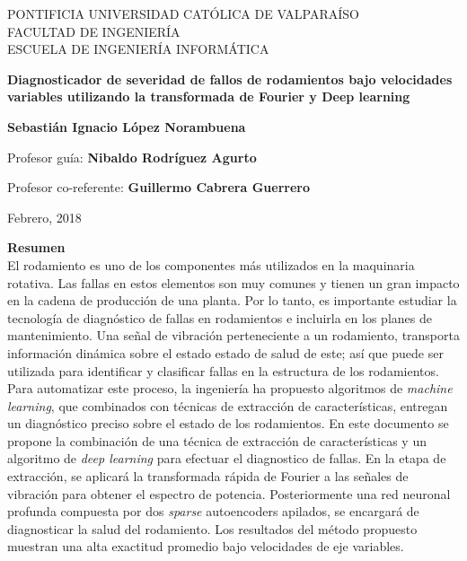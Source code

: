 \documentclass[12pt]{article}
\begin{document}
\thispagestyle{empty}

\begin{center}
PONTIFICIA UNIVERSIDAD CATÓLICA DE VALPARAÍSO\\
FACULTAD DE INGENIERÍA\\
ESCUELA DE INGENIERÍA INFORMÁTICA\\

\vspace{4cm}

\Large{\textbf{Diagnosticador de severidad de fallos de rodamientos bajo velocidades variables utilizando la transformada de Fourier y Deep learning}}

\vspace{3cm}

\normalsize{\textbf{Sebastián Ignacio López Norambuena}}\\
\end{center}

\vspace{3cm}
\begin{center} 
Profesor guía: \textbf{Nibaldo Rodríguez Agurto}
\end{center}
\begin{center} 
Profesor co-referente: \textbf{Guillermo Cabrera Guerrero}
\end{center}
\vspace{1cm}
\begin{center} 
Febrero, 2018
\end{center}
\newpage
{}

\noindent
\Large{\textbf{Resumen}}\\

\normalsize
\noindent El rodamiento es uno de los componentes más utilizados en la maquinaria rotativa. Las fallas en estos elementos son muy comunes y tienen un gran impacto en la cadena de producción de una planta. Por lo tanto, es importante estudiar la tecnología de diagnóstico de fallas en rodamientos e incluirla en los planes de mantenimiento. Una señal de vibración perteneciente a un rodamiento, transporta información dinámica sobre el estado estado de salud de este; así que puede ser utilizada para identificar y clasificar fallas en la estructura de los rodamientos. Para automatizar este proceso, la ingeniería ha propuesto algoritmos de \textit{machine learning}, que combinados con técnicas de extracción de características, entregan un diagnóstico preciso sobre el estado de los rodamientos. En este documento se propone la combinación de una técnica de extracción de características y un algoritmo de \textit{deep learning} para efectuar el diagnostico de fallas. En la etapa de extracción, se aplicará la transformada rápida de Fourier a las señales de vibración para obtener el espectro de potencia. Posteriormente una red neuronal profunda compuesta por dos \textit{sparse} autoencoders apilados, se encargará de diagnosticar la salud del rodamiento. Los resultados del método propuesto muestran una alta exactitud promedio bajo velocidades de eje variables.
\newline
\end{document}
